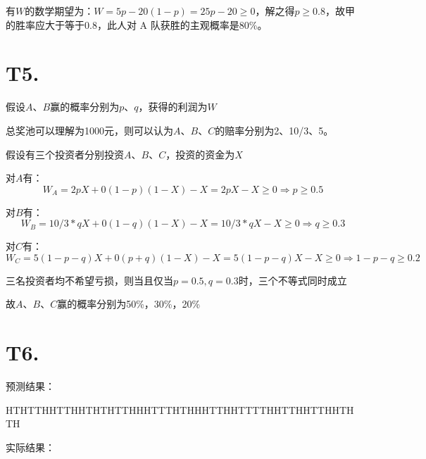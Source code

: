 \documentclass[utf8]{article}
\begin{document}
有$W$的数学期望为：$W=5p-20(1-p)=25p-20\geq0$，解之得$p\geq0.8$，故甲的胜率应大于等于0.8，此人对 A 队获胜的主观概率是80\%。

\section*{T5. }

假设$A$、$B$赢的概率分别为$p$、$q$，获得的利润为$W$

总奖池可以理解为1000元，则可以认为$A$、$B$、$C$的赔率分别为2、10/3、5。

假设有三个投资者分别投资$A$、$B$、$C$，投资的资金为$X$

对$A$有：\[W_A=2pX+0(1-p)(1-X)-X=2pX-X\geq0\Rightarrow p\geq0.5\]

对$B$有：\[W_B=10/3*qX+0(1-q)(1-X)-X=10/3*qX-X\geq0\Rightarrow q\geq0.3\]

对$C$有：\[W_C=5(1-p-q)X+0(p+q)(1-X)-X=5(1-p-q)X-X\geq0\Rightarrow 1-p-q\geq0.2\]

三名投资者均不希望亏损，则当且仅当$p=0.5,q=0.3$时，三个不等式同时成立

故$A$、$B$、$C$赢的概率分别为50\%，30\%，20\%

\section*{T6. }

预测结果：

HTHTTHHTTHHTHTHTTHHHTTTHTHHHTTHHTTTTHHTTHHTTHHTHTH

实际结果：
\end{document}
